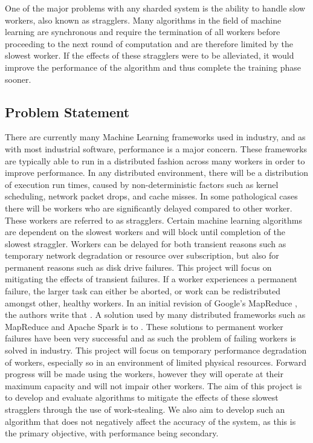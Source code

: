 \documentclass[12pt]{article}
\begin{document}
\newline
\newline
One of the major problems with any sharded system is the ability to handle slow workers, also known as stragglers. Many algorithms in the field of machine learning are synchronous and require the termination of all workers before proceeding to the next round of computation and are therefore limited by the slowest worker. If the effects of these stragglers were to be alleviated, it would improve the performance of the algorithm and thus complete the training phase sooner.

\newpage

\subsection{Problem Statement}
There are currently many Machine Learning frameworks used in industry, and as with most industrial software, performance is a major concern. These frameworks are typically able to run in a distributed fashion across many workers in order to improve performance. In any distributed environment, there will be a distribution of execution run times, caused by non-deterministic factors such as kernel scheduling, network packet drops, and cache misses. In some pathological cases there will be workers who are significantly delayed compared to other worker. These workers are referred to as stragglers. Certain machine learning algorithms are dependent on the slowest workers and will block until completion of the slowest straggler.
\newline
Workers can be delayed for both transient reasons such as temporary network degradation or resource over subscription, but also for permanent reasons such as disk drive failures. This project will focus on mitigating the effects of transient failures. If a worker experiences a permanent failure, the larger task can either be aborted, or work can be redistributed amongst other, healthy workers. In an initial revision of Google's MapReduce \citep{dean2008mapreduce}, the authors write that . A solution used by many distributed frameworks such as MapReduce and Apache Spark \cite{zaharia2012resilient} is to .
\newline
These solutions to permanent worker failures have been very successful and as such the problem of failing workers is solved in industry. This project will focus on temporary performance degradation of workers, especially so in an environment of limited physical resources. Forward progress will be made using the workers, however they will operate at their maximum capacity and will not impair other workers.
\newline
The aim of this project is to develop and evaluate algorithms to mitigate the effects of these slowest stragglers through the use of work-stealing. We also aim to develop such an algorithm that does not negatively affect the accuracy of the system, as this is the primary objective, with performance being secondary.
\end{document}
